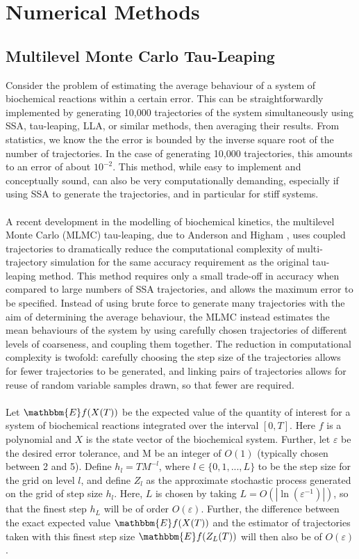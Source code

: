\documentclass[ugrad,lot,lof,openright,11pt,oneside,onehalfspace]{RUthesis}
\begin{document}
\chapter{Numerical Methods}

	\section{Multilevel Monte Carlo Tau-Leaping}

		Consider the problem of estimating the average behaviour of a system of biochemical reactions within a certain error. This can be straightforwardly implemented by generating 10,000 trajectories of the system simultaneously using SSA, tau-leaping, LLA, or similar methods, then averaging their results. From statistics, we know the the error is bounded by the inverse square root of the number of trajectories. In the case of generating 10,000 trajectories, this amounts to an error of about $10^{-2}$. This method, while easy to implement and conceptually sound, can also be very computationally demanding, especially if using SSA to generate the trajectories, and in particular for stiff systems.\\
		\\
		A recent development in the modelling of biochemical kinetics, the multilevel Monte Carlo (MLMC) tau-leaping, due to Anderson and Higham \cite{mlmc_applications}, uses coupled trajectories to dramatically reduce the computational complexity of multi-trajectory simulation for the same accuracy requirement as the original tau-leaping method. This method requires only a small trade-off in accuracy when compared to large numbers of SSA trajectories, and allows the maximum error to be specified. Instead of using brute force to generate many trajectories with the aim of determining the average behaviour, the MLMC instead estimates the mean behaviours of the system by using carefully chosen trajectories of different levels of coarseness, and coupling them together. The reduction in computational complexity is twofold: carefully choosing the step size of the trajectories allows for fewer trajectories to be generated, and linking pairs of trajectories allows for reuse of random variable samples drawn, so that fewer are required.\\
		\\
		Let $\mathbbm{E}f(X(T))$ be the expected value of the quantity of interest for a system of biochemical reactions integrated over the interval $[0,T]$. Here $f$ is a polynomial and $X$ is the state vector of the biochemical system. Further, let $\varepsilon$ be the desired error tolerance, and M be an integer of $O(1)$ (typically chosen between 2 and 5). Define $h_l = TM^{-l}$, where $l \in \{ 0,1,...,L \}$ to be the step size for the grid on level $l$, and define $Z_l$ as the approximate stochastic process generated on the grid of step size $h_l$. Here, $L$ is chosen by taking $L = O( | \ln(\varepsilon^{-1}) | )$, so that the finest step $h_L$ will be of order $O(\varepsilon)$. Further, the difference between the exact expected value $\mathbbm{E}f(X(T))$ and the estimator of trajectories taken with this finest step size $\mathbbm{E}f(Z_L(T))$ will then also be of $O(\varepsilon)$.\\
\end{document}
